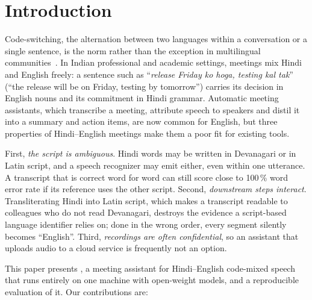 \section{Introduction}
\label{sec:introduction}

Code-switching, the alternation between two languages within a conversation or a
single sentence, is the norm rather than the exception in multilingual
communities~\cite{sitaram2019survey}. In Indian professional and academic
settings, meetings mix Hindi and English freely: a sentence such as
``\textit{release Friday ko hoga, testing kal tak}'' (``the release will be on
Friday, testing by tomorrow'') carries its decision in English nouns and its
commitment in Hindi grammar. Automatic meeting assistants, which transcribe a
meeting, attribute speech to speakers and distil it into a summary and action
items, are now common for English, but three properties of Hindi--English
meetings make them a poor fit for existing tools.

First, \emph{the script is ambiguous}. Hindi words may be written in Devanagari
or in Latin script, and a speech recognizer may emit either, even within one
utterance. A transcript that is correct word for word can still score close to
100\,\% word error rate if its reference uses the other script. Second,
\emph{downstream steps interact}. Transliterating Hindi into Latin script, which
makes a transcript readable to colleagues who do not read Devanagari, destroys
the evidence a script-based language identifier relies on; done in the wrong
order, every segment silently becomes ``English''. Third, \emph{recordings are
often confidential}, so an assistant that uploads audio to a cloud service is
frequently not an option.

This paper presents \system{}, a meeting assistant for Hindi--English
code-mixed speech that runs entirely on one machine with open-weight models, and
a reproducible evaluation of it. Our contributions are:

